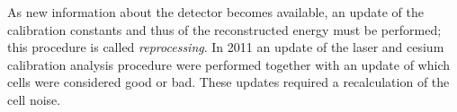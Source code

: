 As new information about the detector becomes available, an update of the
calibration constants and thus of the reconstructed energy must be performed;
this procedure is called \emph{reprocessing}. In 2011 an update of the laser and
cesium calibration analysis procedure were performed together with an update of
which cells were considered good or bad. These updates required a recalculation
of the cell noise.
